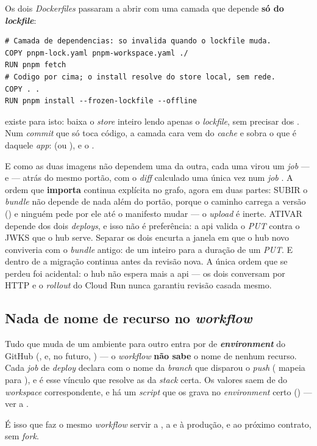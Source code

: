 Os dois \emph{Dockerfiles} passaram a abrir com uma camada que depende
\textbf{só do \emph{lockfile}}:

\begin{lstlisting}[language=bashunoo, caption={A camada de dependências (api e hub)}]
# Camada de dependencias: so invalida quando o lockfile muda.
COPY pnpm-lock.yaml pnpm-workspace.yaml ./
RUN pnpm fetch
# Codigo por cima; o install resolve do store local, sem rede.
COPY . .
RUN pnpm install --frozen-lockfile --offline
\end{lstlisting}

 existe para isto: baixa o \emph{store} inteiro lendo apenas o
\emph{lockfile}, sem precisar dos . Num \emph{commit} que só
toca código, a camada cara vem do \emph{cache} e sobra o que é daquele
\emph{app}:  (ou ),  e o
.

E como as duas imagens não dependem uma da outra, cada uma virou um \emph{job}
---  e  --- atrás do mesmo portão, com o
\emph{diff} calculado uma única vez num \emph{job} . A ordem que
\textbf{importa} continua explícita no grafo, agora em duas partes: SUBIR o
\emph{bundle} não depende de nada além do portão, porque o caminho carrega a
versão () e ninguém pede por ele até o manifesto
mudar --- o \emph{upload} é inerte. ATIVAR depende dos dois \emph{deploys}, e
isso não é preferência: a api valida o \emph{PUT} contra o JWKS que o hub serve.
Separar os dois encurta a janela em que o hub novo conviveria com o
\emph{bundle} antigo: de um  inteiro para a duração de um
\emph{PUT}. E dentro de  a migração continua antes da revisão
nova. A única ordem que se
perdeu foi acidental: o hub não espera mais a api --- os dois conversam por
HTTP e o \emph{rollout} do Cloud Run nunca garantiu revisão casada mesmo.

\subsection{Nada de nome de recurso no \emph{workflow}}

\begin{decisao}
Tudo que muda de um ambiente para outro entra por  de
\textbf{\emph{environment}} do GitHub (,  e, no futuro,
) --- o \emph{workflow} \textbf{não sabe} o nome de nenhum recurso. Cada
\emph{job} de \emph{deploy} declara  com o nome da
\emph{branch} que disparou o \emph{push} ( mapeia para ), e é
esse vínculo que resolve as  da \emph{stack} certa. Os valores saem de
 do \emph{workspace} correspondente, e há um \emph{script}
que os grava no \emph{environment} certo
() --- ver a .

É isso que faz o mesmo \emph{workflow} servir a , a  e à
produção, e ao próximo contrato, sem \emph{fork}.
\end{decisao}

